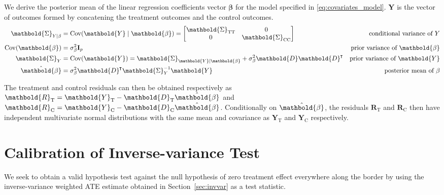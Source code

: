 \documentclass[letter,12pt]{article}
\DeclarePairedDelimiter{\parenthesis}{\lparen}{\rparen}
\newcommand{\del}[1]{\parenthesis*{#1}}
\DeclareMathOperator{\cov}{{Cov}}
\newcommand*{\trans}{^{\mkern-1.5mu\intercal}}
\newcommand{\treat}{\mathrm{T}}
\newcommand{\ctrol}{\mathrm{C}}
\newcommand{\sigmabeta}{\sigma_{\beta}}
\newcommand{\Yvec}{\mathbold{Y}}
\newcommand{\yt}{\Yvec_{\treat}}
\newcommand{\yc}{\Yvec_{\ctrol}}
\newcommand{\betavec}{\mathbold{\beta}}
\newcommand{\residvec}{\mathbold{R}}
\newcommand{\eye}{\mathbf{I}}
\newcommand{\Dmat}{\mathbold{D}}
\newcommand{\SigmaMat}{\mathbold{\Sigma}}
\newcommand{\STT}{\SigmaMat_{\treat \treat}}
\newcommand{\SCC}{\SigmaMat_{\ctrol \ctrol}}
\begin{document}
We derive the posterior mean of the linear regression coefficients vector \(\betavec\) for the model specified in \eqref{eq:covariates_model}. $\Yvec$ is the vector of outcomes formed by concatening the treatment outcomes and the control outcomes.
\begin{equation}
    \begin{aligned}
        \SigmaMat_{Y \mid \beta} &= \cov\del{\Yvec \mid \betavec }
        = \begin{bmatrix}
            \STT & 0 \\
            0 & \SCC
        \end{bmatrix}
        & \text{conditional variance of $Y$} \\
        \cov\del{\betavec} &= \sigmabeta^2 \eye_p
                           & \text{prior variance of $\betavec$} \\
        \SigmaMat_Y &= \cov\del{\Yvec} 
        = \SigmaMat_{\Yvec \mid \betavec} 
        + \sigmabeta^2 \Dmat \Dmat\trans
        & \text{prior variance of $\Yvec$} \\
        \hat\betavec &= \sigmabeta^2 \Dmat\trans\SigmaMat_{Y}^{-1} \Yvec
                     & \text{posterior mean of $\beta$}
    \end{aligned}
\end{equation}



The treatment and control residuals can then be obtained respectively as \(\residvec_\treat = \yt - \Dmat_\treat \hat\betavec\) and \(\residvec_\ctrol = \yc - \Dmat_\ctrol \hat\betavec\).
Conditionally on \(\hat\betavec\), the residuals \(\residvec_\treat\) and \(\residvec_\ctrol\) then have independent multivariate normal distributions with the same mean and covariance as \(\yt\) and \(\yc\) respectively.



\hypertarget{calibration-of-inverse-variance-test}{%
\section{Calibration of Inverse-variance Test}\label{calibration-of-inverse-variance-test}}
\label{sec:calibration}

We seek to obtain a valid hypothesis test against the null hypothesis of zero treatment effect everywhere along the border by using the inverse-variance weighted ATE estimate obtained in Section~\ref{sec:invvar} as a test statistic.
\end{document}
